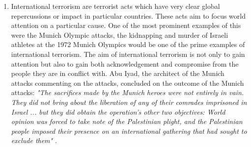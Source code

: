 \begin{enumerate}
\item International terrorism are terrorist acts which have very clear global repercussions or impact in particular countries. These acts aim to focus world attention on a particular cause. One of the most prominent examples of this were the Munich Olympic attacks, the kidnapping and murder of Israeli athletes at the 1972 Munich Olympics would be one of the prime examples of international terrorism. The aim of international terrorism is not only to gain attention but also to gain both acknowledgement and compromise from the people they are in conflict with. Abu Iyad, the architect of the Munich attacks commenting on the attacks, concluded on the outcome of the Munich attacks: \textit{"The sacrifices made by the Munich heroes were not entirely in vain. They did not bring about the liberation of any of their comrades imprisoned in Israel ... but they did obtain the operation's other two objectives: World opinion was forced to take note of the Palestinian plight, and the Palestinian people imposed their presence on an international gathering that had sought to exclude them"} \citep{iyad1981my}.
\end{enumerate}

